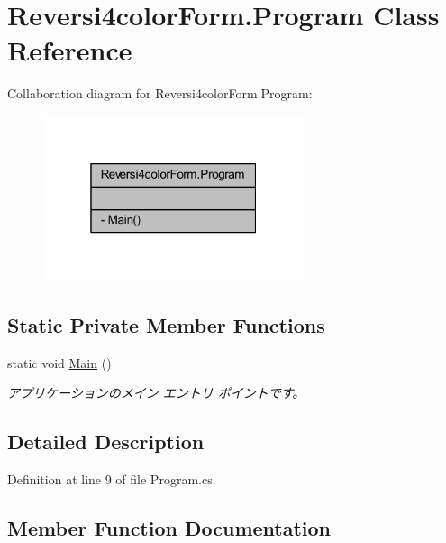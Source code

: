 \hypertarget{class_reversi4color_form_1_1_program}{}\section{Reversi4color\+Form.\+Program Class Reference}
\label{class_reversi4color_form_1_1_program}


Collaboration diagram for Reversi4color\+Form.\+Program\+:\nopagebreak
\begin{figure}[H]
\begin{center}
\leavevmode
\includegraphics[width=217pt]{class_reversi4color_form_1_1_program__coll__graph}
\end{center}
\end{figure}
\subsection*{Static Private Member Functions}
\begin{DoxyCompactItemize}
\item 
static void \hyperlink{class_reversi4color_form_1_1_program_a2edae1f309199d01d6561ca9f1b09454}{Main} ()
\begin{DoxyCompactList}\small\item\em アプリケーションのメイン エントリ ポイントです。 \end{DoxyCompactList}\end{DoxyCompactItemize}


\subsection{Detailed Description}


Definition at line 9 of file Program.\+cs.



\subsection{Member Function Documentation}
\mbox{\label{class_reversi4color_form_1_1_program_a2edae1f309199d01d6561ca9f1b09454}} 
